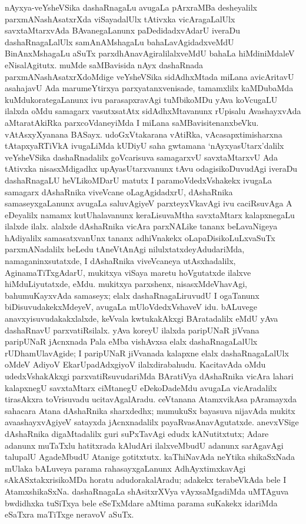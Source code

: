 nAyxya-veYsheVSika dashaRnagaLu avugaLa pArxraMBa desheyalilx parxmANashAsatxrXda viSaya\-dalUlx tAtivxka vicAragaLalUlx savxtaMtarxvAda BAvanegaLanunx paDedidadxvAdarU ive\-raDu dashaRnagaLalUlx samAnAMshagaLu bahaLavAgidadxveMdU BinAnxMshagaLu aSuTx parxdhAna\-vAgi\-ralilalxveMdU bahaLa hiMdiniMdaleV eNisalAgitutx. muMde saMBavi\-sida nAyx dashaRnada parxmANashAsatxrXdoMdige veYsheVSika sidAdhxMtada miLana avicA\-ritavU asahajavU Ada marumeYtirxya parxyatanxvenisade, tamamxlilx kaMDubaMda kuMdukorategaLanunx ivu para\-sapxravAgi tuMbikoMDu yAva koVcugaLU ilalxda oMdu samagarx vasutxsatAtx sidAdhxMta\-vanunx rUpisalu AvashayxvAda aMtaratAkiRka parxcoVdaneyiMda I miLana saMBavisi\-tenanxbeVku. vAtAsxyXyanana BASayx. udoGxVtakarana vAtiRka, vAcasapxtimisharxna tAtapxyaR\-TiVkA ivugaLiMda kUDiyU saha gwtamana `nAyxyasUtarx'dalilx veYsheVSika dashaRnadalilx goVcarisuva samagarxvU savxtaMtarxvU Ada tAtivxka nisasxMdigadhx upAyasUtarxvanunx tAvu odagisikoDuvudAgi iveraDu dashaRnagaLU heVLikoMDarU matutx I paramoV\-dedxVshakekx ivugaLa samagarx dAshaRnika viveVcane oLagAgidadxrU, dAshaRnika samaseyxgaLanunx avu\-gaLa saluvAgiyeV parxteyxVkavAgi ivu caciRsuvAga A eDeyalilx namamx kutUhala\-vanunx keraLi\-suvaMtha savxtaMtarx kalapxnegaLu ilalxde ilalx. alalxde dAshaRnika vicAra parxNA\-Like tananx beLavaNigeya hAdiyalilx samasatxvanUnx tananx adhiVnakekx oLapaDisikoLuLxvaSuTx parxmANa\-dalilx beLedu tAneVtAnAgi nilulxtatxdeyAdudariMda, namaganinxsutatxde, I dAshaRnika viveVcaneya utAsxhadalilx, AginamaTiTxgAdarU, mukitxya viSaya maretu hoVgutatxde ilalxve hiMduLiyutatxde, eMdu. mukitxya parxshenx, nisasxMdeVhavAgi, bahumuKayxvAda samaseyx; elalx dashaRnagaLiruvudU I ogaTanunx biDisuvudakekxMdeyeV, avugaLa mUloV\-dedxVshaveV idu. bALuvege anavxyisuvudakakxlalxde, keVvala kwtukakAkxgi BAratadalilx eMdU yAva dashaRnavU parxvatiRsilalx. yAva koreyU ilalxda paripUNaR jiVvana paripUNaR jAcnxnada Pala eMba vishAvxsa elalx dashaRnagaLalUlx rUDhamUlavAgide; I paripUNaR jiVvanada kalapxne elalx dashaRnagaLalUlx oMdeV AdiyoV EkarUpadAdxgiyoV ilalxdira\-bahudu. KacitavAda oMdu udedxVshakAkxgi parxvatiRsuvudariMda BAratiVya dAshaRnika vicAra lahari kalapxnegU savxtaMtarx ciMtanegU eDekoDadeMdu avugaLa vicAradalilx tira\-sAkxra toVrisuvadu ucitavAgalAradu. ceVtanana AtamxvikAsa pAramayxda sahacara Atana dAshaRnika sharxdedhx; mumukuSx bayasuva nijavAda mukitx avaashayxvAgiyeV satayxda jAcnxna\-dalilx payaRvasAnavAgutatxde. anevxVSige dAshaRnika digaMtadalilx guri suPxTavAgi edudx kANutitxtutx; Adare adanunx muTaTxlu hatitxrada kAludAri ilalxveMbudU adanunx sarAga\-vAgi talupalU AgadeMbudU Atanige gotitxtutx. kaThiNavAda neYtika shikaSxNada \hbox{mUlaka} bALuveya parama rahasayxgaLanunx AdhAyxtimxkavAgi sAkASxtakxrisikoMDa horatu adu\break doraka\-lAradu; adakekx terabeVkAda bele I AtamxshikaSxNa. dashaRnagaLa shAsitxrXVya vAyxsaMga\-diMda uMTAguva bwdidhxka tuSiTxya bele eSeTxMdare aMtima parama suKakekx idariMda eSaTxra maTiTxge neravoV aSuTx.

